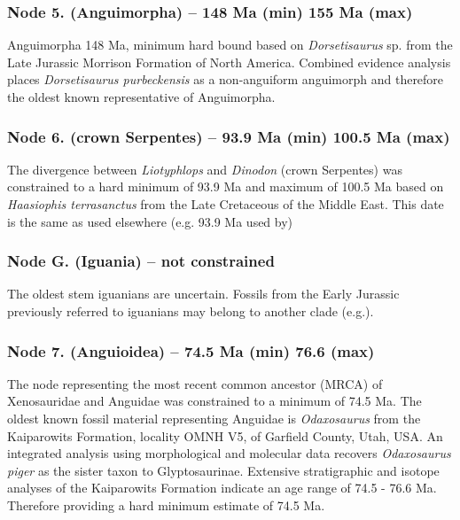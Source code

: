 \documentclass[a4paper, 12pt]{article}
\begin{document}
\subsubsection*{Node 5. (Anguimorpha) – 148 Ma (min) 155 Ma (max)}
Anguimorpha 148 Ma, minimum hard bound based on \textit{Dorsetisaurus} sp. from the Late Jurassic Morrison Formation of North America\cite{prothero1980late,evans1999upper,conrad2008phylogeny,jones2013integration}. Combined evidence analysis places \textit{Dorsetisaurus purbeckensis} as a non-anguiform anguimorph and therefore the oldest known representative of Anguimorpha\cite{conrad2011combined}.
 
\subsubsection*{Node 6. (crown Serpentes) – 93.9 Ma (min) 100.5 Ma (max)}
The divergence between \textit{Liotyphlops} and \textit{Dinodon} (crown Serpentes) was constrained to a hard minimum of 93.9 Ma and maximum of 100.5 Ma based on \textit{Haasiophis terrasanctus} from the Late Cretaceous of the Middle East\cite{tchernov2000fossil,rieppel2003anatomy}. This date is the same as used elsewhere (e.g. 93.9 Ma used by\cite{head2015fossil,hsiang2015origin})
 
\subsubsection*{Node G. (Iguania) – not constrained}
The oldest stem iguanians are uncertain\cite{bolet2013fossil}. Fossils from the Early Jurassic previously referred to iguanians\cite{evans2002fossil} may belong to another clade (e.g.\cite{jones2013integration}).
 
\subsubsection*{Node 7. (Anguioidea) – 74.5 Ma (min) 76.6 (max)}
The node representing the most recent common ancestor (MRCA) of Xenosauridae and Anguidae was constrained to a minimum of 74.5 Ma. The oldest known fossil material representing Anguidae is \textit{Odaxosaurus}\cite{nydam2013lizards} from the Kaiparowits Formation, locality OMNH V5, of Garfield County, Utah, USA. An integrated analysis using morphological and molecular data recovers \textit{Odaxosaurus piger} as the sister taxon to Glyptosaurinae\cite{conrad2011combined}. Extensive stratigraphic and isotope analyses of the Kaiparowits Formation indicate an age range of 74.5 - 76.6 Ma\cite{roberts200540ar,roberts2013kaiparowits}. Therefore providing a hard minimum estimate of 74.5 Ma. 
 
\end{document}
